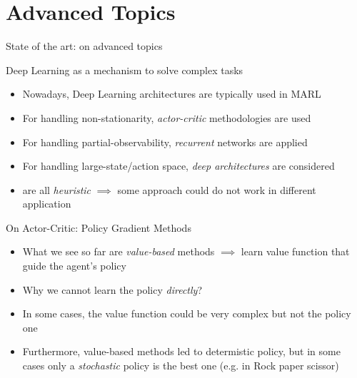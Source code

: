 \documentclass[presentation]{beamer}\mode<presentation>{\usetheme{AMSBolognaFC}}
\begin{document}
\section{Advanced Topics}
\begin{frame}{State of the art: on advanced topics}
	\begin{exampleblock}{Deep Learning as a mechanism to solve complex tasks}
		\begin{itemize}
			\item Nowadays, Deep Learning architectures are typically used in MARL
			\item For handling non-stationarity, \emph{actor-critic} methodologies are used
			\item For handling partial-observability, \emph{recurrent} networks are applied
			\item For handling large-state/action space, \emph{deep architectures} are considered
			\item[{\color{red}\faThumbsDown}] are all \emph{heuristic} $\implies$ some approach could do not work in different application
		\end{itemize}
	\end{exampleblock}
\end{frame}

\begin{frame}{On Actor-Critic: Policy Gradient Methods}
	\begin{exampleblock}{}
		\begin{itemize}
			\item What we see so far are \emph{value-based} methods $\implies$ learn value function that guide the agent's policy
			\item[\faLightbulbO] Why we cannot learn the policy \emph{directly}?
			\item In some cases, the value function could be very complex but not the policy one
			\item Furthermore, value-based methods led to determistic policy, but in some cases only a \emph{stochastic} policy is the best one (e.g. in Rock paper scissor)
		\end{itemize}
	\end{exampleblock}
\end{frame}
\end{document}
